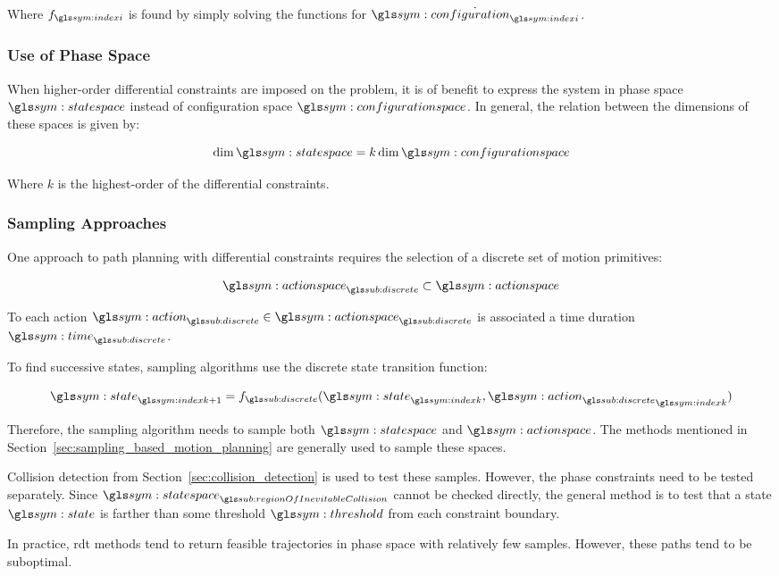 		Where $f_{\indexi}$ is found by simply solving the functions for
		$\dot{\configuration_{\indexi}}$.

		\subsubsection{Use of Phase Space}%
		\label{sec:use_of_phase_space}

			When higher-order differential constraints are imposed on the
			problem, it is of benefit to express the system in phase space
			$\phasespace$ instead of configuration space $\configurationspace$.
			In general, the relation between the dimensions of these spaces is
			given by:

			\begin{equation}
				\dim\phasespace = k\dim\configurationspace
			\end{equation}

			Where $k$ is the highest-order of the differential constraints.

		\subsubsection{Sampling Approaches}%
		\label{sec:sampling_approaches}

			One approach to path planning with differential constraints requires
			the selection of a discrete set of motion primitives:

			\begin{equation}
				\actionspace_{\discrete} \subset \actionspace
			\end{equation}

			To each action $\action_{\discrete} \in \actionspace_{\discrete}$ is
			associated a time duration $\timesym_{\discrete}$.

			To find successive states, sampling algorithms use the discrete
			state transition function:

			\begin{equation}
				\state_{\indexk + 1} = f_{\discrete}(\state_{\indexk},
					{\action_{\discrete}}_{\indexk})
			\end{equation}

			Therefore, the sampling algorithm needs to sample both $\phasespace$
			and $\actionspace$. The methods mentioned in
			Section~\ref{sec:sampling_based_motion_planning} are generally used
			to sample these spaces.

			Collision detection from Section~\ref{sec:collision_detection} is
			used to test these samples. However, the phase constraints need to
			be tested separately. Since
			$\phasespace_{\regionOfInevitableCollision}$ cannot be checked
			directly, the general method is to test that a state $\state$ is
			farther than some threshold $\threshold$ from each constraint
			boundary.

			In practice, \gls{rdt} methods tend to return feasible trajectories
			in phase space with relatively few samples. However, these paths
			tend to be suboptimal.



